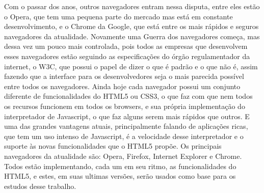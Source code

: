 Com o passar dos anos, outros navegadores entram nessa disputa, entre
eles estão o Opera, que tem uma pequena parte do mercado mas está em
constante desenvolvimento, e o Chrome da Google, que está entre os
mais rápidos e seguros navegadores da atualidade.
Novamente uma Guerra dos navegadores começa, mas dessa vez um pouco
mais controlada, pois todos as empresas que desenvolvem esses
navegadores estão seguindo as especificações do órgão regulamentador da internet,
o W3C, que possui o papel de dizer o que é padrão e o que não é,
assim fazendo que a interface para os desenvolvedores seja o mais
parecida possível entre todos os navegadores.
Ainda hoje cada navegador possui um conjunto diferente de funcionalidades
do HTML5 ou CSS3, o que faz com que nem todos os recursos funcionem em todos
os browsers, e sua própria implementação do
interpretador de Javascript, o que faz alguns serem mais rápidos que
outros. E uma das grandes vantagens atuais, principalmente falando de
aplicações ricas, que tem um uso intenso de Javascript, é a velocidade
desse interpretador e o suporte às novas funcionalidades que o HTML5
propõe.
Os principais navegadores da atualidade são: Opera, Firefox, Internet
Explorer e Chrome. Todos estão implementando, cada um em seu ritmo, as
funcionalidades do HTML5, e estes, em suas ultimas versões, serão usados
como base para os estudos desse trabalho.
